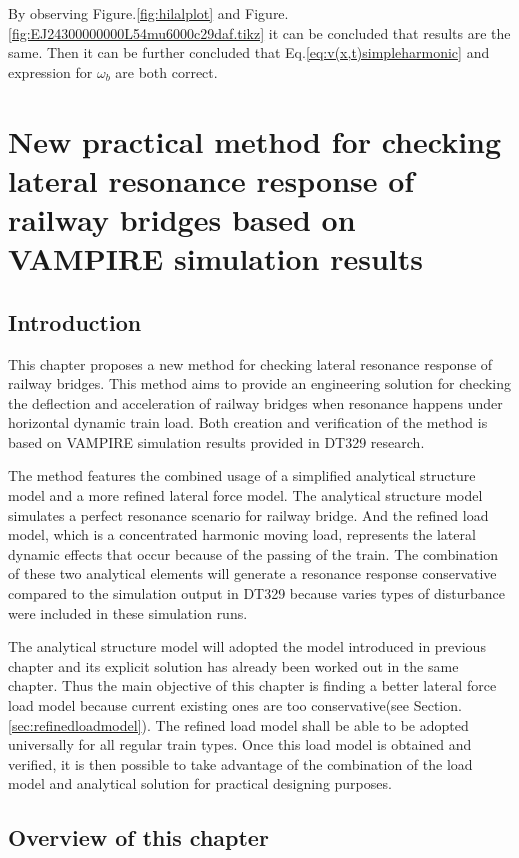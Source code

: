 By observing Figure.\ref{fig:hilalplot} and Figure.\ref{fig:EJ24300000000L54mu6000c29daf.tikz} it can be concluded that results are the same. Then it can be further concluded that Eq.\ref{eq:v(x,t)simpleharmonic} and expression for $\omega_b$ are both correct.


\chapter{New practical method for checking lateral resonance response of railway bridges based on VAMPIRE simulation results }\label{sec:parcticalmethod}

\section{Introduction}

This chapter proposes a new method for checking lateral resonance response of railway bridges. This method aims to provide an engineering solution for checking the deflection and acceleration of railway bridges when resonance happens under horizontal dynamic train load. Both creation and verification of the method is based on VAMPIRE simulation results provided in DT329 research.

The method features the combined usage of a simplified analytical structure model and a more refined lateral force model. The analytical structure model simulates a perfect resonance scenario for railway bridge. And the refined load model, which is a concentrated harmonic moving load, represents the lateral dynamic effects that occur because of the passing of the train. The combination of these two analytical elements will generate a resonance response conservative compared to the simulation output in DT329 because varies types of disturbance were included in these simulation runs.

The analytical structure model will adopted the model introduced in previous chapter and its explicit solution has already been worked out in the same chapter. Thus the main objective of this chapter is finding a better lateral force load model because current existing ones are too conservative(see Section.\ref{sec:refinedloadmodel}). The refined load model shall be able to be adopted universally for all regular train types. Once this load model is obtained and verified, it is then possible to take advantage of the combination of the load model and analytical solution for practical designing purposes.

\section{Overview of this chapter}

